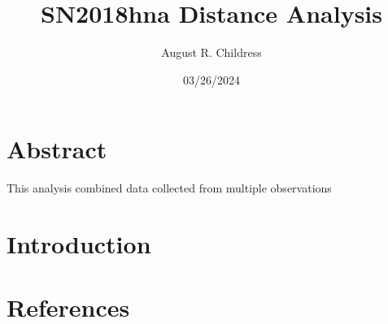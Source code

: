 \documentclass{article}
\author{August R. Childress}
\title{SN2018hna Distance Analysis}
\date{03/26/2024}
\begin{document}
\maketitle

\section{Abstract}
This analysis combined data collected from multiple observations 

\section{Introduction}





\section{References}


\end{document}

